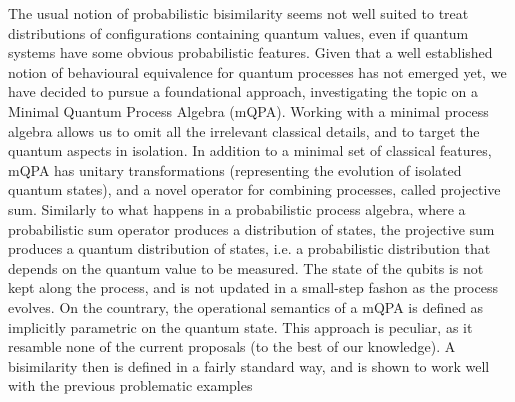 The usual notion of probabilistic bisimilarity seems not well suited to treat distributions of configurations containing quantum values, even if quantum systems have some obvious probabilistic features. Given that a well established notion of behavioural equivalence for quantum processes has not emerged yet, we have decided to pursue a foundational approach, investigating the topic on a Minimal Quantum Process Algebra (mQPA).
Working with a minimal process algebra allows us to omit all the irrelevant classical details, and to target the quantum aspects in isolation.
In addition to a minimal set of classical features, mQPA has unitary transformations (representing the evolution of isolated quantum states),
and a novel operator for combining processes, called projective sum.
Similarly to what happens in a probabilistic process algebra, where a probabilistic sum operator produces a distribution
of states, the projective sum produces a quantum distribution of states, i.e. a probabilistic distribution that depends on the quantum value
to be measured.
The state of the qubits is not kept along the process, and is not updated in a small-step fashon as the process evolves.
On the countrary, the operational semantics of a mQPA is defined as implicitly parametric on the quantum state.
This approach is peculiar, as it resamble none of the current proposals (to the best of our knowledge).
A bisimilarity then is defined in a fairly standard way, and is shown to work well with the previous problematic examples
 